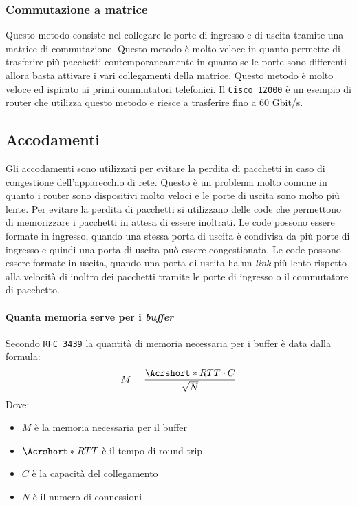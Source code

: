         \subsubsection{Commutazione a matrice}
            Questo metodo consiste nel collegare le porte di ingresso e di uscita tramite una matrice di commutazione. Questo metodo è molto veloce in quanto permette di trasferire più pacchetti contemporaneamente in quanto se le porte sono differenti allora basta attivare i vari collegamenti della matrice. Questo metodo è molto veloce ed ispirato ai primi commutatori telefonici. Il \texttt{Cisco 12000} è un esempio di router che utilizza questo metodo e riesce a trasferire fino a 60 Gbit/s.
    \subsection{Accodamenti}
        Gli accodamenti sono utilizzati per evitare la perdita di pacchetti in caso di congestione dell'apparecchio di rete. Questo è un problema molto comune in quanto i router sono dispositivi molto veloci e le porte di uscita sono molto più lente. Per evitare la perdita di pacchetti si utilizzano delle code che permettono di memorizzare i pacchetti in attesa di essere inoltrati.
        Le code possono essere formate in ingresso, quando una stessa porta di uscita è condivisa da più porte di ingresso e quindi una porta di uscita può essere congestionata. Le code possono essere formate in uscita, quando una porta di uscita ha un \textit{link} più lento rispetto alla velocità di inoltro dei pacchetti tramite le porte di ingresso o il commutatore di pacchetto.
        \paragraph{Quanta memoria serve per i \textit{buffer}} Secondo \texttt{\Acrshort*{RFC} 3439} la quantità di memoria necessaria per i buffer è data dalla formula: \[M = \frac{\Acrshort*{RTT} \cdot C}{\sqrt{N}}\] Dove: \begin{itemize}
            \item $M$ è la memoria necessaria per il buffer
            \item $\Acrshort*{RTT}$ è il tempo di round trip
            \item $C$ è la capacità del collegamento
            \item $N$ è il numero di connessioni
        \end{itemize}
